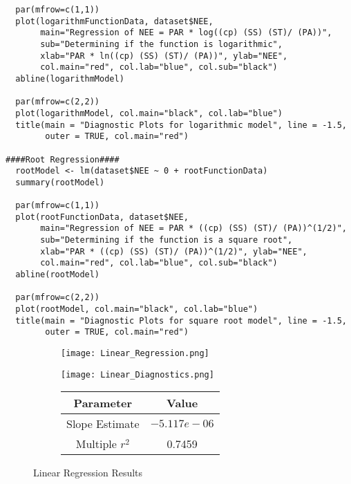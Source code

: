 \documentclass{article}
\begin{document}
\begin{verbatim}
  par(mfrow=c(1,1))
  plot(logarithmFunctionData, dataset$NEE, 
       main="Regression of NEE = PAR * log((cp) (SS) (ST)/ (PA))", 
       sub="Determining if the function is logarithmic",
       xlab="PAR * ln((cp) (SS) (ST)/ (PA))", ylab="NEE",
       col.main="red", col.lab="blue", col.sub="black")
  abline(logarithmModel)
  
  par(mfrow=c(2,2))
  plot(logarithmModel, col.main="black", col.lab="blue")
  title(main = "Diagnostic Plots for logarithmic model", line = -1.5, 
        outer = TRUE, col.main="red")
  
####Root Regression####
  rootModel <- lm(dataset$NEE ~ 0 + rootFunctionData)
  summary(rootModel)
  
  par(mfrow=c(1,1))
  plot(rootFunctionData, dataset$NEE,
       main="Regression of NEE = PAR * ((cp) (SS) (ST)/ (PA))^(1/2)", 
       sub="Determining if the function is a square root",
       xlab="PAR * ((cp) (SS) (ST)/ (PA))^(1/2)", ylab="NEE",
       col.main="red", col.lab="blue", col.sub="black")
  abline(rootModel)
  
  par(mfrow=c(2,2))
  plot(rootModel, col.main="black", col.lab="blue")
  title(main = "Diagnostic Plots for square root model", line = -1.5, 
        outer = TRUE, col.main="red")
\end{verbatim}
\begin{figure}[p] %
    \centering
    \begin{subfigure}{0.49\textwidth}
        \centering
        \texttt{[image: Linear\_Regression.png]}
    \end{subfigure}
    \begin{subfigure}{0.49\textwidth}
        \centering
        \texttt{[image: Linear\_Diagnostics.png]}
    \end{subfigure}
    \begin{subfigure}{\textwidth}
        \centering
        \vspace{0.5cm}
        \begin{tabular}{|c|c|}
        \hline
        Parameter & Value \\ \hline \hline
        Slope Estimate & $-5.117e-06$ \\ \hline
        Multiple $r^2$ & 0.7459 \\ \hline
        \end{tabular}
    \end{subfigure}
    \caption{Linear Regression Results}
\end{figure}
\end{document}
